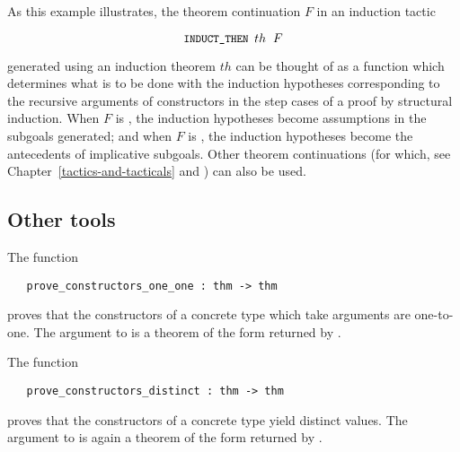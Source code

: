 As this example illustrates, the theorem continuation $F$ in
an induction tactic

\[ \ml{INDUCT\_THEN }th\;\;F \]

\noindent generated using an induction theorem $th$ can be thought of as a
function which determines what is to be done with the induction hypotheses
corresponding to the recursive arguments of constructors in the step
cases of a proof by structural induction.  When $F$ is ,
the induction hypotheses become assumptions in the subgoals generated; and when
$F$ is , the induction hypotheses become the antecedents of
implicative subgoals.  Other theorem continuations (for which, see
Chapter~\ref{tactics-and-tacticals} and \REFERENCE) can also be used.

\subsection{Other tools}

The function

\begin{boxed}
\begin{verbatim}
   prove_constructors_one_one : thm -> thm
\end{verbatim}\end{boxed}

\noindent proves that the constructors
 of a concrete type which take arguments
are one-to-one.  The argument to  is a
theorem of the form returned by .

The function

\begin{boxed}
\begin{verbatim}
   prove_constructors_distinct : thm -> thm
\end{verbatim}\end{boxed}

\noindent proves that the constructors
 of a concrete type yield distinct values.  The argument to
 is again
a theorem of the form returned by .

